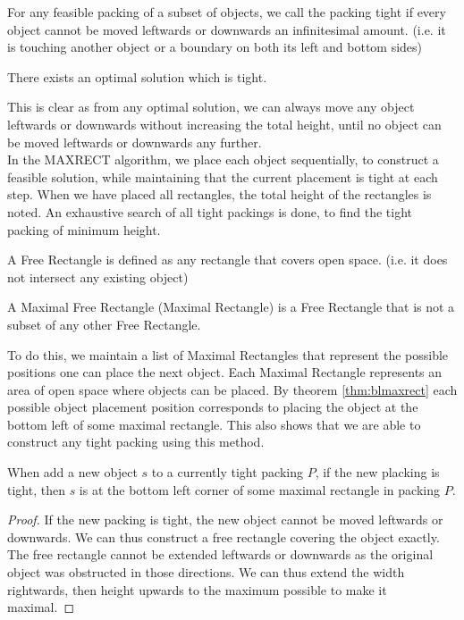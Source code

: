 \documentclass{article}
\begin{document}
\begin{defn}
For any feasible packing of a subset of objects, we call the packing tight if every object cannot be moved leftwards or downwards an infinitesimal amount. (i.e. it is touching another object or a boundary on both its left and bottom sides)
\begin{defn}

\begin{thm}
There exists an optimal solution which is tight.
\end{thm}
This is clear as from any optimal solution, we can always move any object leftwards or downwards without increasing the total height, until no object can be moved leftwards or downwards any further.\\

In the MAXRECT algorithm, we place each object sequentially, to construct a feasible solution, while maintaining that the current placement is tight at each step. When we have placed all rectangles, the total height of the rectangles is noted. An exhaustive search of all tight packings is done, to find the tight packing of minimum height.

\begin{defn}
A Free Rectangle is defined as any rectangle that covers open space. (i.e. it does not intersect any existing object)
\end{defn}

\begin{defn}
A Maximal Free Rectangle (Maximal Rectangle) is a Free Rectangle that is not a subset of any other Free Rectangle.
\end{defn}

To do this, we maintain a list of Maximal Rectangles that represent the possible positions one can place the next object. Each Maximal Rectangle represents an area of open space where objects can be placed. By theorem \ref{thm:blmaxrect} each possible object placement position corresponds to placing the object at the bottom left of some maximal rectangle. This also shows that we are able to construct any tight packing using this method.

\begin{thm}
\label{thm:blmaxrect}
When add a new object $s$ to a currently tight packing $P$, if the new placking is tight, then $s$ is at the bottom left corner of some maximal rectangle in packing $P$.
\end{thm}
\begin{proof}
If the new packing is tight, the new object cannot be moved leftwards or downwards. We can thus construct a free rectangle covering the object exactly. The free rectangle cannot be extended leftwards or downwards as the original object was obstructed in those directions. We can thus extend the width rightwards, then height upwards to the maximum possible to make it maximal.
\end{proof}


\end{defn}
\end{defn}
\end{document}
